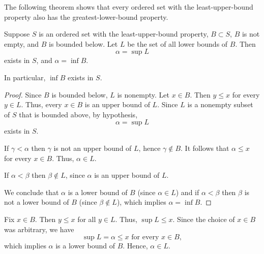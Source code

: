 The following theorem shows that every ordered set with the least-upper-bound property also has the greatest-lower-bound property.
\begin{theorem}
Suppose $S$ is an ordered set with the least-upper-bound property, $B \subset S$, $B$ is not empty, and $B$ is bounded below. Let $L$ be the set of all lower bounds of $B$. Then \[\alpha = \sup L\] exists in $S$, and $\alpha = \inf B$.

In particular, $\inf B$ exists in $S$.
\end{theorem}
\begin{proof}
Since $B$ is bounded below, $L$ is nonempty. 
Let $x \in B$. Then $y \leq x$ for every $y \in L$. 
Thus, every $x \in B$ is an upper bound of $L$. 
Since $L$ is a nonempty subset of $S$ that is bounded above, by hypothesis, \[\alpha = \sup L\] exists in $S$.

If $\gamma < \alpha$ then $\gamma$ is not an upper bound of $L$, hence $\gamma \notin B$. It follows that $\alpha \leq x$ for every $x \in B$. Thus, $\alpha \in L$.

If $\alpha < \beta$ then $\beta \notin L$, since $\alpha$ is an upper bound of $L$.

We conclude that $\alpha$ is a lower bound of $B$ (since $\alpha \in L$) and if $\alpha < \beta$ then $\beta$ is not a lower bound of $B$ (since $\beta \notin L$), which implies $\alpha = \inf B$.
\end{proof}
\begin{remark}
Fix $x \in B$. Then $y \leq x$ for all $y \in L$. Thus, $\sup L \leq x$. Since the choice of $x \in B$ was arbitrary, we have 
\[
\sup L = \alpha \leq x \text{ for every } x \in B,
\]
which implies $\alpha$ is a lower bound of $B$. Hence, $\alpha \in L$.
\end{remark}
